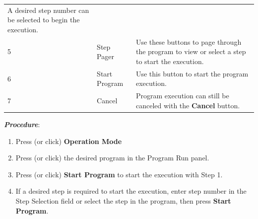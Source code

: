 \begin{longtable}[]{@{}|l|l|l|@{}}
\begin{minipage}[t]{0.65\columnwidth}
A desired step number can be selected to begin the execution.\strut
\end{minipage}\tabularnewline
\begin{minipage}[t]{0.04\columnwidth}\raggedright
5\strut
\end{minipage} & \begin{minipage}[t]{0.23\columnwidth}\raggedright
Step Pager\strut
\end{minipage} & \begin{minipage}[t]{0.65\columnwidth}\raggedright
Use these buttons to page through the program to view or select a step
to start the execution.\strut
\end{minipage}\tabularnewline
\begin{minipage}[t]{0.04\columnwidth}\raggedright
6\strut
\end{minipage} & \begin{minipage}[t]{0.23\columnwidth}\raggedright
Start Program\strut
\end{minipage} & \begin{minipage}[t]{0.65\columnwidth}\raggedright
Use this button to start the program execution.\strut
\end{minipage}\tabularnewline
\begin{minipage}[t]{0.04\columnwidth}\raggedright
7\strut
\end{minipage} & \begin{minipage}[t]{0.23\columnwidth}\raggedright
Cancel\strut
\end{minipage} & \begin{minipage}[t]{0.65\columnwidth}\raggedright
Program execution can still be canceled with the \textbf{Cancel}
button.\strut
\end{minipage}\tabularnewline
\bottomrule
\end{longtable}

\textbf{\emph{Procedure}}:

\begin{enumerate}
\def\labelenumi{\arabic{enumi}.}
\tightlist
\item
  Press (or click) \textbf{Operation Mode}
\item
  Press (or click) the desired program in the Program Run panel.
\item
  Press (or click) \textbf{Start Program} to start the execution with
  Step 1.
\item
  If a desired step is required to start the execution, enter step
  number in the Step Selection field or select the step in the program,
  then press \textbf{Start Program}.
\end{enumerate}

